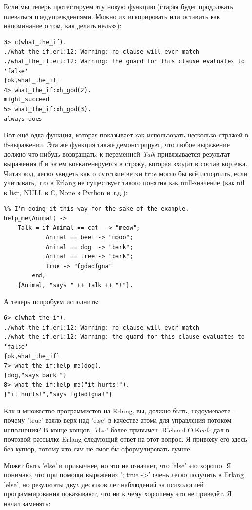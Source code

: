 \documentclass[a4paper,12pt]{report}
\newcommand{\ops}{\colorbox{lgreen}}
\begin{document}
Если мы теперь протестируем эту новую функцию (старая будет продолжать плеваться предупреждениями. Можно их игнорировать или оставить как напоминание о том, как делать нельзя):
\begin{lstlisting}[style=erlang]
3> c(what_the_if).
./what_the_if.erl:12: Warning: no clause will ever match
./what_the_if.erl:12: Warning: the guard for this clause evaluates to 'false'
{ok,what_the_if}
4> what_the_if:oh_god(2).
might_succeed
5> what_the_if:oh_god(3).
always_does
\end{lstlisting}

Вот ещё одна функция, которая показывает как использовать несколько стражей в \ops{if}\--выражении. Эта же функция также демонстрирует, что любое выражение должно что\--нибудь возвращать: к переменной \emph{Talk} привязывается результат выражения \ops{if} и затем конкатенируется в строку, которая входит в состав кортежа. Читая код, легко увидеть как отсутствие ветки \ops{true} могло бы всё испортить, если учитывать, что в Erlang не существует такого понятия как null\--значение (как nil в lisp, NULL в C, None в Python и т.д.):
\begin{lstlisting}[style=erlang]
%% note, this one would be better as a pattern match in function heads!
%% I'm doing it this way for the sake of the example.
help_me(Animal) ->
    Talk = if Animal == cat  -> "meow";
            Animal == beef -> "mooo";
            Animal == dog  -> "bark";
            Animal == tree -> "bark";
            true -> "fgdadfgna"
        end,
    {Animal, "says " ++ Talk ++ "!"}.
\end{lstlisting}
А теперь попробуем исполнить:
\begin{lstlisting}[style=erlang]
6> c(what_the_if).
./what_the_if.erl:12: Warning: no clause will ever match
./what_the_if.erl:12: Warning: the guard for this clause evaluates to 'false'
{ok,what_the_if}
7> what_the_if:help_me(dog).
{dog,"says bark!"}
8> what_the_if:help_me("it hurts!").
{"it hurts!","says fgdadfgna!"}
\end{lstlisting}
Как и множество программистов на Erlang, вы, должно быть, недоумеваете \--- почему 'true' взяло верх над 'else' в качестве атома для управления потоком исполнения? В конце концов, 'else' более привычен. Richard O'Keefe дал в почтовой рассылке Erlang следующий ответ на этот вопрос. Я привожу его здесь без купюр, потому что сам не смог бы сформулировать лучше:\\
\colorbox{lgray}
{
    \begin{minipage}{\linewidth}
    Может быть 'else' и привычнее, но это не означает, что 'else' это хорошо. Я понимаю, что при помощи выражения '; true ->' очень легко получить в Erlang 'else', но результаты двух десятков лет наблюдений за психологией программирования показывают, что ни к чему хорошему это не приведёт. Я начал заменять:
\end{minipage}
}
\end{document}
